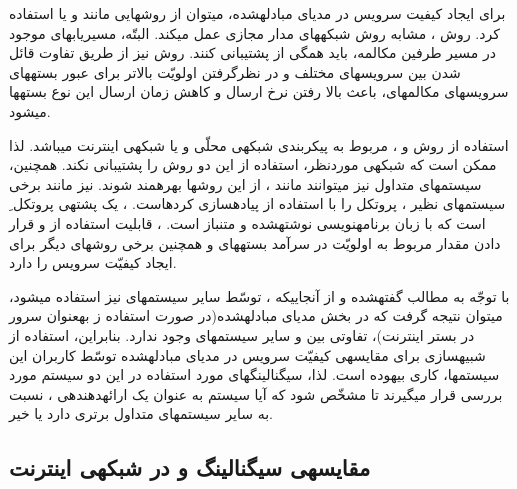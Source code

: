برای ایجاد کیفیت سرویس در مدیای مبادله\nf شده، می\nf توان از روش\nf هایی مانند  و یا  استفاده کرد. روش ، مشابه روش شبکه\nf های مدار مجازی عمل می\nf کند. البتّه، مسیریاب\nf های موجود در مسیر طرفین مکالمه، باید همگی از  پشتیبانی کنند. روش  نیز از طریق تفاوت قائل شدن بین سرویس\nf های مختلف و در نظرگرفتن اولویّت بالاتر برای عبور بسته\nf های سرویس\nf های مکالمه\nf ای، باعث بالا رفتن نرخ ارسال و کاهش زمان ارسال این نوع بسته\nf ها می\nf شود\cite{cn}.


استفاده از روش  و ، مربوط به پیکربندی شبکه\nf ی محلّی و یا شبکه\nf ی اینترنت می\nf باشد. لذا ممکن است که شبکه\nf ی موردنظر، استفاده از این دو روش را پشتیبانی نکند. همچنین، سیستم\nf های  متداول نیز می\nf توانند مانند ، از این روش\nf ها بهره\nf مند شوند.  نیز مانند برخی سیستم\nf های  نظیر ، پروتکل  را با استفاده از  پیاده\nf سازی کرده\nf است. ، یک پشته\nf ی پروتکل ِ  است که با زبان برنامه\nf نویسی  نوشته\nf شده و متن\nf باز است. ، قابلیت استفاده از  و قرار دادن مقدار مربوط به اولویّت در سرآمد بسته\nf های  و همچنین برخی روش\nf های دیگر برای ایجاد کیفیّت سرویس را دارد\cite{webpjsip}.


با توجّه به مطالب گفته\nf شده و از آنجایی\nf که ، توسّط سایر سیستم\nf های  نیز استفاده می\nf شود، می\nf توان نتیجه گرفت که در بخش مدیای مبادله\nf شده(در صورت استفاده ز  به\nf عنوان سرور  در بستر اینترنت)، تفاوتی بین  و سایر سیستم\nf های  وجود ندارد. بنابراین، استفاده از شبیه\nf سازی برای مقایسه\nf ی کیفیّت سرویس در مدیای مبادله\nf شده توسّط کاربران این سیستم\nf ها، کاری بیهوده است. لذا، سیگنالینگ\nf های مورد استفاده در این دو سیستم مورد بررسی قرار می\nf گیرند تا مشخّص شود که آیا سیستم  به عنوان یک ارائه\nf دهنده\nf ی ، نسبت به سایر سیستم\nf های متداول  برتری دارد یا خیر.


\subsection{مقایسه\nf ی سیگنالینگ  و  در شبکه\nf ی اینترنت}
